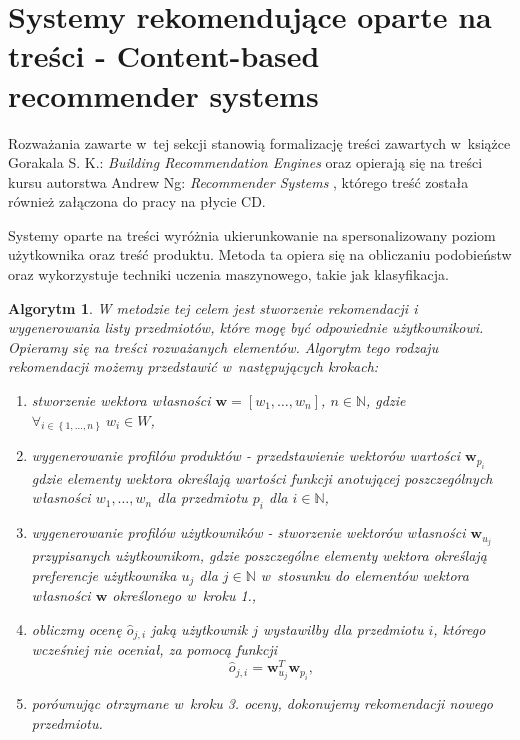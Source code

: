 \documentclass[12pt,a4paper]{report}
\newtheorem{algorytm}[df]{Algorytm}
\newcommand{\set}[1]{\left\lbrace {#1} \right\rbrace}
\newcommand{\setN}{\mathbb{N}}
\newcommand{\setWlasnosci}{\mathit{W}}
\begin{document}
\section{Systemy rekomendujące oparte na treści - Content-based recommender systems}
Rozważania zawarte w~tej sekcji stanowią formalizację treści zawartych w~książce Gorakala S. K.: \textit{Building Recommendation Engines} {\citep[Sec 3]{bre}} oraz opierają się na treści kursu autorstwa Andrew Ng: \textit{Recommender Systems} {\citep{rs}}, którego treść została również załączona do pracy na płycie CD.
\bigskip

Systemy oparte na treści wyróżnia ukierunkowanie na spersonalizowany poziom użytkownika oraz treść produktu. Metoda ta opiera się na obliczaniu podobieństw oraz wykorzystuje techniki uczenia maszynowego, takie jak klasyfikacja.

\begin{algorytm}
W metodzie tej celem jest stworzenie rekomendacji i wygenerowania listy przedmiotów, które mogę być odpowiednie użytkownikowi. Opieramy się na treści rozważanych elementów. Algorytm tego rodzaju rekomendacji możemy przedstawić w~następujących krokach:
\begin{enumerate}
\item stworzenie wektora własności $\mathbf{w} = [w_1, \ldots, w_n]$, $n \in \setN$, gdzie $\forall_{i \in \set{1, \ldots, n}} \: w_i \in \setWlasnosci$,

\item wygenerowanie profilów produktów - przedstawienie wektorów wartości $\mathbf{w}_{p_i}$ gdzie elementy wektora określają wartości funkcji anotującej poszczególnych własności $w_1, \ldots, w_n$ dla przedmiotu $p_i$ dla $i \in \setN$,

\item wygenerowanie profilów użytkowników - stworzenie wektorów własności $\mathbf{w}_{u_j}$ przypisanych użytkownikom, gdzie poszczególne elementy wektora określają preferencje użytkownika $u_j$ dla $j \in \setN$ w~stosunku do elementów wektora własności $\mathbf{w}$ określonego w~kroku 1.,

\item obliczmy ocenę $\widehat{o}_{j,i}$ jaką użytkownik $j$ wystawiłby dla przedmiotu $i$, którego wcześniej nie oceniał, za pomocą funkcji
$$
\widehat{o}_{j,i} = \mathbf{w}_{u_j}^T \mathbf{w}_{p_i},
$$

\item porównując otrzymane w~kroku 3. oceny, dokonujemy rekomendacji nowego przedmiotu.
\end{enumerate}
\end{algorytm}
\end{document}
